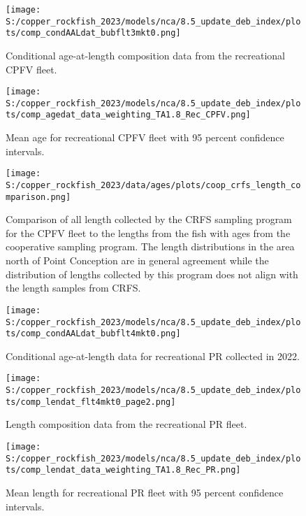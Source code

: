 \documentclass[11pt,
  english,
  letterpaper,
]{article}
\begin{document}
\begin{figure}
\centering
\texttt{[image: S:/copper\_rockfish\_2023/models/nca/8.5\_update\_deb\_index/plots/comp\_condAALdat\_bubflt3mkt0.png]}
\caption{Conditional age-at-length composition data from the recreational CPFV fleet.\label{fig:rec-cpfv-caal-data}}
\end{figure}

\begin{figure}
\centering
\texttt{[image: S:/copper\_rockfish\_2023/models/nca/8.5\_update\_deb\_index/plots/comp\_agedat\_data\_weighting\_TA1.8\_Rec\_CPFV.png]}
\caption{Mean age for recreational CPFV fleet with 95 percent confidence intervals.\label{fig:mean-rec-cpfv-age-data}}
\end{figure}

\begin{figure}
\centering
\texttt{[image: S:/copper\_rockfish\_2023/data/ages/plots/coop\_crfs\_length\_comparison.png]}
\caption{Comparison of all length collected by the CRFS sampling program for the CPFV fleet to the lengths from the fish with ages from the cooperative sampling program. The length distributions in the area north of Point Conception are in general agreement while the distribution of lengths collected by this program does not align with the length samples from CRFS.\label{fig:coop-len-comparison}}
\end{figure}

\begin{figure}
\centering
\texttt{[image: S:/copper\_rockfish\_2023/models/nca/8.5\_update\_deb\_index/plots/comp\_condAALdat\_bubflt4mkt0.png]}
\caption{Conditional age-at-length data for recreational PR collected in 2022.\label{fig:rec-pr-caal-data}}
\end{figure}

\begin{figure}
\centering
\texttt{[image: S:/copper\_rockfish\_2023/models/nca/8.5\_update\_deb\_index/plots/comp\_lendat\_flt4mkt0\_page2.png]}
\caption{Length composition data from the recreational PR fleet.\label{fig:rec-pr-len-data}}
\end{figure}

\begin{figure}
\centering
\texttt{[image: S:/copper\_rockfish\_2023/models/nca/8.5\_update\_deb\_index/plots/comp\_lendat\_data\_weighting\_TA1.8\_Rec\_PR.png]}
\caption{Mean length for recreational PR fleet with 95 percent confidence intervals.\label{fig:mean-rec-pr-len-data}}
\end{figure}
\end{document}
